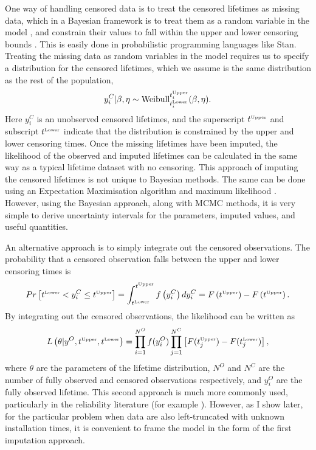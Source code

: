 One way of handling censored data is to treat the censored lifetimes as missing data, which in a Bayesian framework is to treat them as a random variable in the model \citep[p.211]{reich2019}, and constrain their values to fall within the upper and lower censoring bounds \citep{stan_user_guide2024}. This is easily done in probabilistic programming languages like Stan. Treating the missing data as random variables in the model requires us to specify a distribution for the censored lifetimes, which we assume is the same distribution as the rest of the population,
\begin{equation}
    \label{eq:impute-cens}
    y^C_i|\beta, \eta \sim \hbox{Weibull}^{t^{\hbox{\tiny{Upper}}}_i}_{t^{\hbox{\tiny{Lower}}}_i}(\beta, \eta).
\end{equation}
Here $y^C_i$ is an unobserved censored lifetimes, and the superscript $t^{\hbox{\tiny{Upper}}}$ and subscript $t^{\hbox{\tiny{Lower}}}$ indicate that the distribution is constrained by the upper and lower censoring times. Once the missing lifetimes have been imputed, the likelihood of the observed and imputed lifetimes can be calculated in the same way as a typical lifetime dataset with no censoring. This approach of imputing the censored lifetimes is not unique to Bayesian methods. The same can be done using an Expectation Maximisation algorithm and maximum likelihood \citep{mitra2013}. However, using the Bayesian approach, along with MCMC methods, it is very simple to derive uncertainty intervals for the parameters, imputed values, and useful quantities.

An alternative approach is to simply integrate out the censored observations. The probability that a censored observation falls between the upper and lower censoring times is
\begin{equation}
    \label{eq:integrate-out-cens}
    Pr\left[t^{\hbox{\tiny{Lower}}} < y^C_i \leq t^{\hbox{\tiny{Upper}}}\right] = \int_{t^{\hbox{\tiny{Lower}}}}^{t^{\hbox{\tiny{Upper}}}} f\left(y^C_i\right) d y^C_i = F\left(t^{\hbox{\tiny{Upper}}}\right) - F\left(t^{\hbox{\tiny{Upper}}}\right).
\end{equation}
By integrating out the censored observations, the likelihood can be written as
\begin{equation}
    \label{eq:censored_likelihood}
    L\left(\theta|y^O, t^{\hbox{\tiny{Upper}}}, t^{\hbox{\tiny{Lower}}}\right) = \prod^{N^O}_{i = 1}f(y^O_i) \prod^{N^C}_{j = 1}\left[F(t^{\hbox{\tiny{Upper}}}_j) - F(t^{\hbox{\tiny{Lower}}}_j)\right],
\end{equation}
where $\theta$ are the parameters of the lifetime distribution, $N^O$ and $N^C$ are the number of fully observed and censored observations respectively, and $y^O_i$ are the fully observed lifetime. This second approach is much more commonly used, particularly in the reliability literature (for example \citet{Meeker2022,tian2024,hong2009,mittman2013}). However, as I show later, for the particular problem when data are also left-truncated with unknown installation times, it is convenient to frame the model in the form of the first imputation approach.

